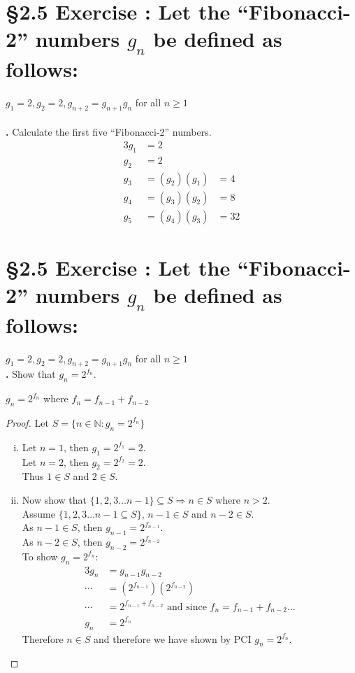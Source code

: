 \documentclass[a4paper,11pt]{article}
\begin{document}
\setcounter{ProblemCounter}{11}
\section*{\S 2.5 Exercise : Let the ``Fibonacci-2'' numbers \(g_n\) be defined as follows:}
\(g_1=2, g_2=2, g_{n+2}=g_{n+1}g_n\) for all \(n \geq 1\)\\\\
\setcounter{SubsectionCounter}{1}
\textbf{.}
Calculate the first five ``Fibonacci-2'' numbers.\\
\begin{alignat*}{3}
  g_1 &= 2\\
  g_2 &= 2\\
  g_3 &= {(g_2)}{(g_1)} &= 4\\
  g_4 &= {(g_3)}{(g_2)} &= 8\\
  g_5 &= {(g_4)}{(g_3)} &= 32
\end{alignat*}
\newpage
\section*{\S 2.5 Exercise : Let the ``Fibonacci-2'' numbers \(g_n\) be defined as follows:}
\(g_1=2, g_2=2, g_{n+2}=g_{n+1}g_n\) for all \(n \geq 1\)\\
\setcounter{SubsectionCounter}{2}
\noindent\textbf{.}
Show that \(g_n=2^{f_{n}}\).
\begin{theorem1}
  \(g_n=2^{f_{n}}\) where \(f_n = f_{n-1} + f_{n-2}\)
  \begin{proof}
    Let \(S = \{n \in \mathbb{N}: g_n = 2^{f_n}\}\)
    \begin{enumerate}[(i)]
      \item Let \(n=1\), then \(g_1 = 2^{f_1} = 2\).\\
      Let \(n =2 \), then \(g_2 = 2^{f_2} = 2\).\\
      Thus \(1 \in S\) and \(2 \in S\).
      \item Now show that \(\{1, 2, 3\ldots n-1\} \subseteq S \Rightarrow n \in 
      S\) where \(n > 2\).\\
      Assume \(\{1,2,3\ldots n-1 \subseteq S\}\), \(n-1 \in S\) and \(n-2 \in 
      S\).\\
      As \(n-1 \in S\), then \(g_{n-1}=2^{f_{n-1}}\).\\
      As \(n-2 \in S\), then \(g_{n-2}=2^{f_{n-2}}\)\\
      To show \(g_n = 2^{f_{n}}\):
      \begin{alignat*}{3}
        g_n &= g_{n-1}g_{n-2}\\
        \cdots &= {(2^{f_{n-1}})}{(2^{f_{n-2}})}\\
        \cdots &= 2^{f_{n-1}+f_{n-2}} \text{ and since } f_n = f_{n-1} + f_{n-2}\ldots\\
        g_n &= 2^{f_{n}}
      \end{alignat*}
      Therefore \(n \in S\) and therefore we have shown by PCI \(g_n = 2^{f_{n}}\).
    \end{enumerate}
  \end{proof}
\end{theorem1}
\newpage
\end{document}
